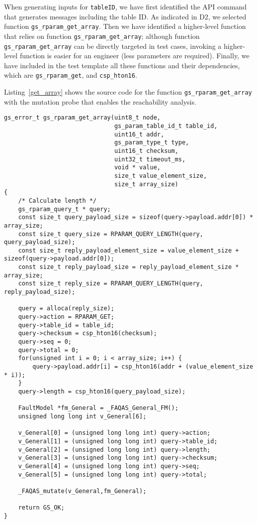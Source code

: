 When generating inputs for \texttt{tableID}, we have first identified the API command that generates messages including the table ID. As indicated in D2, we selected function
\texttt{gs\_rparam\_get\_array}. Then we have identified a higher-level function that relies on function
\texttt{gs\_rparam\_get\_array}; although function \texttt{gs\_rparam\_get\_array} can be directly targeted in test cases, invoking a higher-level function is easier for an engineer (less parameters are required).
Finally, we have included in the test template all these functions and their dependencies, which are \texttt{gs\_rparam\_get}, and \texttt{csp\_hton16}.

Listing~\ref{get_array} shows the source code for the function \texttt{gs\_rparam\_get\_array} with the mutation probe that enables the reachability analysis.

\begin{lstlisting}[style=CStyle,float=t, caption=Instrumented code for function gs\_rparam\_get\_array., label=get_array]
gs_error_t gs_rparam_get_array(uint8_t node,
                               gs_param_table_id_t table_id,
                               uint16_t addr,
                               gs_param_type_t type,
                               uint16_t checksum,
                               uint32_t timeout_ms,
                               void * value,
                               size_t value_element_size,
                               size_t array_size)
{
    /* Calculate length */
    gs_rparam_query_t * query;
    const size_t query_payload_size = sizeof(query->payload.addr[0]) * array_size;
    const size_t query_size = RPARAM_QUERY_LENGTH(query, query_payload_size);
    const size_t reply_payload_element_size = value_element_size + sizeof(query->payload.addr[0]);
    const size_t reply_payload_size = reply_payload_element_size * array_size;
    const size_t reply_size = RPARAM_QUERY_LENGTH(query, reply_payload_size);

    query = alloca(reply_size);
    query->action = RPARAM_GET;
    query->table_id = table_id;
    query->checksum = csp_hton16(checksum);
    query->seq = 0;
    query->total = 0;
    for(unsigned int i = 0; i < array_size; i++) {
        query->payload.addr[i] = csp_hton16(addr + (value_element_size * i));
    }
    query->length = csp_hton16(query_payload_size);

    FaultModel *fm_General = _FAQAS_General_FM();
    unsigned long long int v_General[6];

    v_General[0] = (unsigned long long int) query->action;
    v_General[1] = (unsigned long long int) query->table_id;
    v_General[2] = (unsigned long long int) query->length;
    v_General[3] = (unsigned long long int) query->checksum;
    v_General[4] = (unsigned long long int) query->seq;
    v_General[5] = (unsigned long long int) query->total;

    _FAQAS_mutate(v_General,fm_General);

    return GS_OK;
}
\end{lstlisting}



